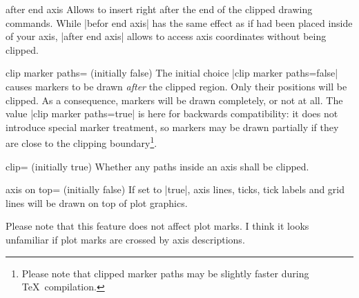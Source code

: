 \begin{pgfplotscodekey}{after end axis}
Allows to insert  right after the end of the clipped drawing commands. While |befor end axis| has the same effect as if  had been placed inside of your axis, |after end axis| allows to access axis coordinates without being clipped.
\begin{codeexample}[]
\end{codeexample}
\end{pgfplotscodekey}

\begin{pgfplotskey}{clip marker paths= (initially false)}
	The initial choice |clip marker paths=false| causes markers to be drawn \emph{after} the clipped region. Only their positions will be clipped. As a consequence, markers will be drawn completely, or not at all. The value |clip marker paths=true| is here for backwards compatibility: it does not introduce special marker treatment, so markers may be drawn partially if they are close to the clipping boundary\footnote{Please note that clipped marker paths may be slightly faster during \TeX\ compilation.}.
\end{pgfplotskey}

\begin{pgfplotskey}{clip= (initially true)}
	Whether any paths inside an axis shall be clipped.
\end{pgfplotskey}

\begin{pgfplotskey}{axis on top= (initially false)}
	If set to |true|, axis lines, ticks, tick labels and grid lines will be drawn on top of plot graphics.
\begin{codeexample}[]
\end{codeexample}

\begin{codeexample}[]
\end{codeexample}
Please note that this feature does not affect plot marks. I think it looks unfamiliar if plot marks are crossed by axis descriptions.
\end{pgfplotskey}

